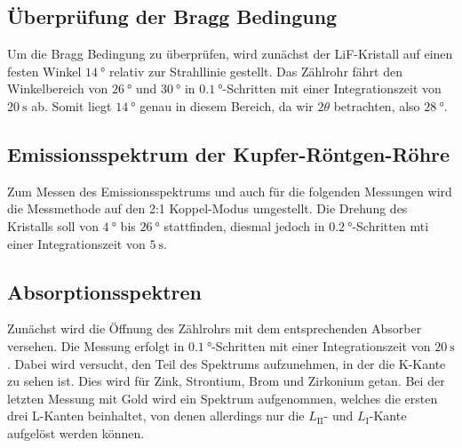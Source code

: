 \subsection{Überprüfung der Bragg Bedingung}

Um die Bragg Bedingung zu überprüfen, wird zunächst der LiF-Kristall auf einen 
festen Winkel $\SI{14}{\degree}$ relativ zur Strahllinie gestellt. 
Das Zählrohr fährt den Winkelbereich von $\SI{26}{\degree}$ und $\SI{30}{\degree}$
in $\SI{0.1}{\degree}$-Schritten mit einer Integrationszeit von $\SI{20}{\second}$
ab. Somit liegt $\SI{14}{\degree}$ genau in diesem Bereich, da wir $2\theta$ betrachten, 
also $\SI{28}{\degree}$.

\subsection{Emissionsspektrum der Kupfer-Röntgen-Röhre}

Zum Messen des Emissionsspektrums und auch für die folgenden Messungen wird die 
Messmethode auf den 2:1 Koppel-Modus umgestellt. 
Die Drehung des Kristalls soll von $\SI{4}{\degree}$ bis $\SI{26}{\degree}$ 
stattfinden, diesmal jedoch in $\SI{0.2}{\degree}$-Schritten mti einer Integrationszeit
von $\SI{5}{\second}$.

\subsection{Absorptionsspektren}

Zunächst wird die Öffnung des Zählrohrs mit dem entsprechenden Absorber versehen. 
Die Messung erfolgt in $\SI{0.1}{\degree}$-Schritten mit einer Integrationszeit
von $\SI{20}{\second}$. Dabei wird versucht, den Teil des Spektrums aufzunehmen, 
in der die K-Kante zu sehen ist. 
Dies wird für Zink, Strontium, Brom und Zirkonium getan. 
Bei der letzten Messung mit Gold wird ein Spektrum aufgenommen, welches die ersten
drei L-Kanten beinhaltet, von denen allerdings nur die $L_\text{II}$- und 
$L_\text{I}$-Kante aufgelöst werden können. 